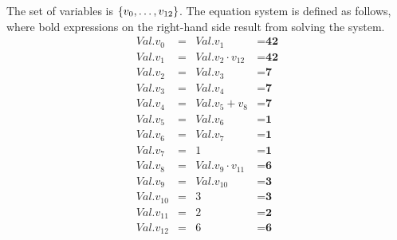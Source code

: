 \begin{solution}
\begin{enumerate}[(a)]
The set of variables is $\left\{ v_0,\hdots,v_{12} \right\}$. The equation system is defined as follows, where bold expressions on the right-hand side result from solving the system.
\[
\begin{array}{lcll}
    Val.v_0    & = & Val.v_1              & = \textbf{42} \\
    Val.v_1    & = & Val.v_2 \cdot v_{12} & = \textbf{42} \\
    Val.v_2    & = & Val.v_3              & = \textbf{7} \\
    Val.v_3    & = & Val.v_4              & = \textbf{7} \\
    Val.v_4    & = & Val.v_5 + v_8        & = \textbf{7} \\
    Val.v_5    & = & Val.v_6              & = \textbf{1} \\
    Val.v_6    & = & Val.v_7              & = \textbf{1} \\
    Val.v_7    & = & 1                    & = \textbf{1} \\
    Val.v_8    & = & Val.v_9 \cdot v_{11} & = \textbf{6} \\
    Val.v_9    & = & Val.v_{10}           & = \textbf{3} \\
    Val.v_{10} & = & 3                    & = \textbf{3} \\
    Val.v_{11} & = & 2                    & = \textbf{2} \\
    Val.v_{12} & = & 6                    & = \textbf{6} \\
\end{array}
\]
\end{enumerate}

\end{solution}
